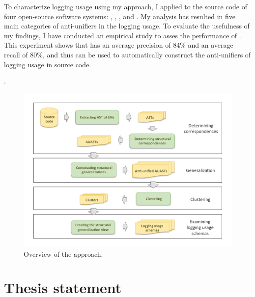 To characterize logging usage using my approach, I applied  to the source code of four open-source software systems: , , , and . My analysis has resulted in five main categories of anti-unifiers in the logging usage. To evaluate the usefulness of my findings, I have conducted an empirical study to asses the performance of . This experiment shows that  has an average precision of 84\% and an average recall of 80\%, and thus can be used to automatically construct the anti-unifiers of logging usage in source code.



. %


\begin{figure} [t]
  \centering\includegraphics [width = \textwidth]{Drawing4/SystemOverview.pdf}
  \caption{Overview of the approach. %
  }
  \label{fig:system_overview}
\end{figure}


\section{Thesis statement} \label{intro-stmt}

